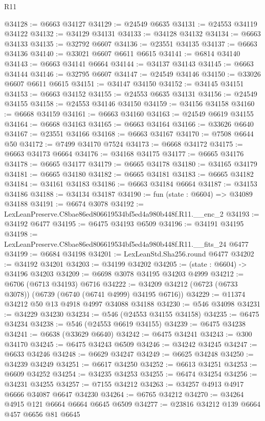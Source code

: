 \begin{lexlean}{R11}
\begin{coremodule}
@34128 := @6663 @34127
@34129 := @24549 @6635
@34131 := @24553 @34119 @34122
@34132 := @34129 @34131
@34133 := @34128 @34132
@34134 := @6663 @34133
@34135 := @32792 @6607
@34136 := @23551 @34135
@34137 := @6663 @34136
@34140 := @33021 @6607 @6611 @6615
@34141 := @6814 @34140
@34143 := @6663 @34141 @6664
@34144 := @34137 @34143
@34145 := @6663 @34144
@34146 := @32795 @6607
@34147 := @24549 @34146
@34150 := @33026 @6607 @6611 @6615
@34151 := @34147 @34150
@34152 := @34145 @34151
@34153 := @6663 @34152
@34155 := @24553 @6635 @34131
@34156 := @24549 @34155
@34158 := @24553 @34146 @34150
@34159 := @34156 @34158
@34160 := @6668 @34159
@34161 := @6663 @34160
@34163 := @24549 @6619 @34155
@34164 := @6668 @34163
@34165 := @6663 @34164
@34166 := @33626 @6640
@34167 := @23551 @34166
@34168 := @6663 @34167
@34170 := @7508 @6644 @50
@34172 := @7499 @34170 @7524
@34173 := @6668 @34172
@34175 := @6663 @34173 @6664
@34176 := @34168 @34175
@34177 := @6665 @34176
@34178 := @6665 @34177
@34179 := @6665 @34178
@34180 := @34165 @34179
@34181 := @6665 @34180
@34182 := @6665 @34181
@34183 := @6665 @34182
@34184 := @34161 @34183
@34186 := @6663 @34184 @6664
@34187 := @34153 @34186
@34188 := @34134 @34187
@34190 := fun (state : @6604) => @34089 @34188
@34191 := @6674 @3078
@34192 := LexLeanPreserve.C8bae86ed806619534bf5ed4a980b448f.R11.__enc_2
@34193 := @34192 @6477
@34195 := @6475 @34193 @6509
@34196 := @34191 @34195
@34198 := LexLeanPreserve.C8bae86ed806619534bf5ed4a980b448f.R11.__fits_24 @6477
@34199 := @6684 @34198
@34201 := LexLeanStd.Sha256.round @6477
@34202 := @34192 @34201
@34203 := @34199 @34202
@34205 := (state : @6604) -> @34196 @34203
@34209 := @6698 @3078 @34195 @34203 @4999
@34212 := @6706 (@6713 @34193) @6716
@34222 := @34209 @34212 (@6723 (@6733 @3078)) (@6739 (@6740 (@6741 @4999) @34195 @6716))
@34229 := @11374 @34212 @50 @13 @4918 @4997 @34088 @34188
@34230 := @546 @34098
@34231 := @34229 @34230
@34234 := @546 (@24553 @34155 @34158)
@34235 := @6475 @34234
@34238 := @546 (@24553 @6619 @34155)
@34239 := @6475 @34238
@34241 := @6638 (@33629 @6640)
@34242 := @6475 @34241
@34243 := @300 @34170
@34245 := @6475 @34243 @6509
@34246 := @34242 @34245
@34247 := @6633 @34246
@34248 := @6629 @34247
@34249 := @6625 @34248
@34250 := @34239 @34249
@34251 := @6617 @34250
@34252 := @6613 @34251
@34253 := @6609 @34252
@34254 := @34235 @34253
@34255 := @6474 @34254
@34256 := @34231 @34255
@34257 := @7155 @34212
@34263 := @34257 @4913 @4917 @6666 @34087 @6647 @34230
@34264 := @6765 @34212
@34270 := @34264 @4915 @121 @6664 @6664 @6645 @6509
@34277 := @23816 @34212 @139 @6664 @457 @6656 @81 @6645

\end{coremodule}
\end{lexlean}
